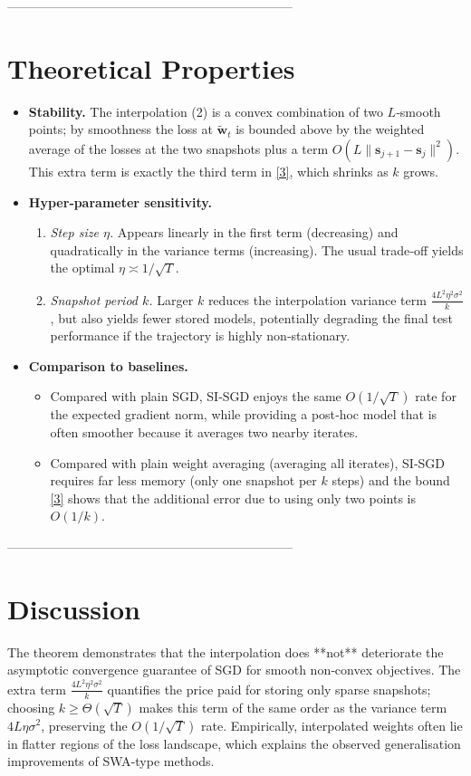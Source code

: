 \documentclass{article}
\begin{document}
--------------------------------------------------------------------

\section*{Theoretical Properties}
\begin{itemize}
\item \textbf{Stability.} The interpolation (2) is a convex combination of two $L$‑smooth points; by smoothness the loss at $\tilde{\mathbf{w}}_t$ is bounded above by the weighted average of the losses at the two snapshots plus a term $O(L\|\mathbf{s}_{j+1}-\mathbf{s}_j\|^2)$. This extra term is exactly the third term in \eqref{3}, which shrinks as $k$ grows.
\item \textbf{Hyper‑parameter sensitivity.}
    \begin{enumerate}
        \item \emph{Step size $\eta$.} Appears linearly in the first term (decreasing) and quadratically in the variance terms (increasing). The usual trade‑off yields the optimal $\eta\asymp 1/\sqrt{T}$.
        \item \emph{Snapshot period $k$.} Larger $k$ reduces the interpolation variance term $\frac{4L^2\eta^2\sigma^2}{k}$, but also yields fewer stored models, potentially degrading the final test performance if the trajectory is highly non‑stationary.
    \end{enumerate}
\item \textbf{Comparison to baselines.}
    \begin{itemize}
        \item Compared with plain SGD, SI‑SGD enjoys the same $O(1/\sqrt{T})$ rate for the expected gradient norm, while providing a post‑hoc model that is often smoother because it averages two nearby iterates.
        \item Compared with plain weight averaging (averaging all iterates), SI‑SGD requires far less memory (only one snapshot per $k$ steps) and the bound \eqref{3} shows that the additional error due to using only two points is $O(1/k)$.
    \end{itemize}
\end{itemize}

--------------------------------------------------------------------

\section*{Discussion}
The theorem demonstrates that the interpolation does **not** deteriorate the asymptotic convergence guarantee of SGD for smooth non‑convex objectives. The extra term $\frac{4L^2\eta^2\sigma^2}{k}$ quantifies the price paid for storing only sparse snapshots; choosing $k\ge \Theta(\sqrt{T})$ makes this term of the same order as the variance term $4L\eta\sigma^2$, preserving the $O(1/\sqrt{T})$ rate. Empirically, interpolated weights often lie in flatter regions of the loss landscape, which explains the observed generalisation improvements of SWA‑type methods.
\end{document}
